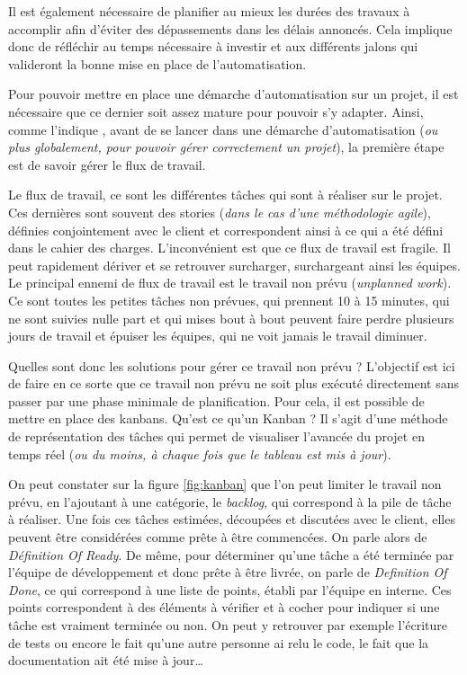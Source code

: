 Il est également nécessaire de planifier au mieux les durées des travaux à accomplir afin d'éviter des dépassements dans les délais annoncés. Cela implique donc de réfléchir au temps nécessaire à investir et aux différents jalons qui valideront la bonne mise en place de l'automatisation. 

Pour pouvoir mettre en place une démarche d'automatisation sur un projet, il est nécessaire que ce dernier soit assez mature pour pouvoir s'y adapter. Ainsi, comme l'indique  \cite{phoenixProject},  avant de se lancer dans une démarche d'automatisation (\emph{ou plus globalement, pour pouvoir gérer correctement un projet}), la première étape est de savoir gérer le flux de travail.

Le flux de travail, ce sont les différentes tâches qui sont à réaliser sur le projet. Ces dernières sont souvent des stories (\emph{dans le cas d'une méthodologie agile}), définies conjointement avec le client et correspondent ainsi à ce qui a été défini dans le cahier des charges. L'inconvénient est que ce flux de travail est fragile. Il peut rapidement dériver et se retrouver surcharger, surchargeant ainsi les équipes. Le principal ennemi de flux de travail est le travail non prévu (\emph{unplanned work}). Ce sont toutes les petites tâches non prévues, qui prennent 10 à 15 minutes, qui ne sont suivies nulle part et qui mises bout à bout peuvent faire perdre plusieurs jours de travail et épuiser les équipes, qui ne voit jamais le travail diminuer.

Quelles sont donc les solutions pour gérer ce travail non prévu ? L'objectif est ici de faire en ce sorte que ce travail non prévu ne soit plus exécuté directement sans passer par une phase minimale de planification. Pour cela, il est possible de mettre en place des kanbans. Qu'est ce qu'un Kanban ? Il s'agit d'une méthode de représentation des tâches qui permet de visualiser l'avancée du projet en temps réel (\emph{ou du moins, à chaque fois que le tableau est mis à jour}). 


On peut constater sur la figure \ref{fig:kanban} que l'on peut limiter le travail non prévu, en l'ajoutant à une catégorie, le \emph{backlog}, qui correspond à la pile de tâche à réaliser. Une fois ces tâches estimées, découpées et discutées avec le client, elles peuvent être considérées comme prête à être commencées. On parle alors de \emph{Définition Of Ready}. De même, pour déterminer qu'une tâche a été terminée par l'équipe de développement et donc prête à être livrée, on parle de \emph{Definition Of Done}, ce qui correspond à une liste de points, établi par l'équipe en interne. Ces points correspondent à des éléments à vérifier et à cocher pour indiquer si une tâche est vraiment terminée ou non. On peut y retrouver par exemple l'écriture de tests ou encore le fait qu'une autre personne ai relu le code, le fait que la documentation ait été mise à jour\ldots

